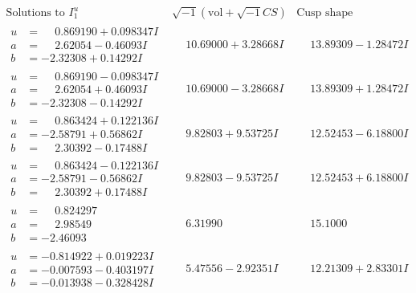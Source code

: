 \documentclass[1p]{elsarticle_modified}
\theoremstyle{definition}
\newcommand{\I}{\sqrt{-1}}
\begin{document}
$$\begin{array}{c|c|c}  
\text{Solutions to }I^u_{1}& \I (\text{vol} + \sqrt{-1}CS) & \text{Cusp shape}\\
 \hline 
\begin{aligned}
u &= \phantom{-}0.869190 + 0.098347 I \\
a &= \phantom{-}2.62054 - 0.46093 I \\
b &= -2.32308 + 0.14292 I\end{aligned}
 & \phantom{-}10.69000 + 3.28668 I & \phantom{-}13.89309 - 1.28472 I \\ \hline\begin{aligned}
u &= \phantom{-}0.869190 - 0.098347 I \\
a &= \phantom{-}2.62054 + 0.46093 I \\
b &= -2.32308 - 0.14292 I\end{aligned}
 & \phantom{-}10.69000 - 3.28668 I & \phantom{-}13.89309 + 1.28472 I \\ \hline\begin{aligned}
u &= \phantom{-}0.863424 + 0.122136 I \\
a &= -2.58791 + 0.56862 I \\
b &= \phantom{-}2.30392 - 0.17488 I\end{aligned}
 & \phantom{-}9.82803 + 9.53725 I & \phantom{-}12.52453 - 6.18800 I \\ \hline\begin{aligned}
u &= \phantom{-}0.863424 - 0.122136 I \\
a &= -2.58791 - 0.56862 I \\
b &= \phantom{-}2.30392 + 0.17488 I\end{aligned}
 & \phantom{-}9.82803 - 9.53725 I & \phantom{-}12.52453 + 6.18800 I \\ \hline\begin{aligned}
u &= \phantom{-}0.824297\phantom{ +0.000000I} \\
a &= \phantom{-}2.98549\phantom{ +0.000000I} \\
b &= -2.46093\phantom{ +0.000000I}\end{aligned}
 & \phantom{-}6.31990\phantom{ +0.000000I} & \phantom{-}15.1000\phantom{ +0.000000I} \\ \hline\begin{aligned}
u &= -0.814922 + 0.019223 I \\
a &= -0.007593 - 0.403197 I \\
b &= -0.013938 - 0.328428 I\end{aligned}
 & \phantom{-}5.47556 - 2.92351 I & \phantom{-}12.21309 + 2.83301 I \\ \hline\begin{aligned}

\end{aligned}
\end{array}$$
\end{document}

